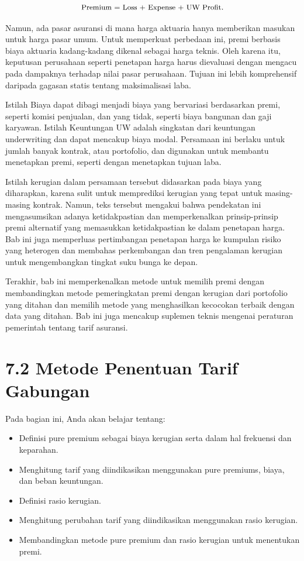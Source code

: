 \documentclass[
]{book}
\providecommand{\tightlist}{%
  \setlength{\itemsep}{0pt}\setlength{\parskip}{0pt}}
\begin{document}
\begin{equation}
\small{
\text{Premium = Loss + Expense + UW Profit} .
}
\end{equation}

Namun, ada pasar asuransi di mana harga aktuaria hanya memberikan masukan untuk harga pasar umum. Untuk memperkuat perbedaan ini, premi berbasis biaya aktuaria kadang-kadang dikenal sebagai harga teknis. Oleh karena itu, keputusan perusahaan seperti penetapan harga harus dievaluasi dengan mengacu pada dampaknya terhadap nilai pasar perusahaan. Tujuan ini lebih komprehensif daripada gagasan statis tentang maksimalisasi laba.

Istilah Biaya dapat dibagi menjadi biaya yang bervariasi berdasarkan premi, seperti komisi penjualan, dan yang tidak, seperti biaya bangunan dan gaji karyawan. Istilah Keuntungan UW adalah singkatan dari keuntungan underwriting dan dapat mencakup biaya modal. Persamaan ini berlaku untuk jumlah banyak kontrak, atau portofolio, dan digunakan untuk membantu menetapkan premi, seperti dengan menetapkan tujuan laba.

Istilah kerugian dalam persamaan tersebut didasarkan pada biaya yang diharapkan, karena sulit untuk memprediksi kerugian yang tepat untuk masing-masing kontrak. Namun, teks tersebut mengakui bahwa pendekatan ini mengasumsikan adanya ketidakpastian dan memperkenalkan prinsip-prinsip premi alternatif yang memasukkan ketidakpastian ke dalam penetapan harga. Bab ini juga memperluas pertimbangan penetapan harga ke kumpulan risiko yang heterogen dan membahas perkembangan dan tren pengalaman kerugian untuk mengembangkan tingkat suku bunga ke depan.

Terakhir, bab ini memperkenalkan metode untuk memilih premi dengan membandingkan metode pemeringkatan premi dengan kerugian dari portofolio yang ditahan dan memilih metode yang menghasilkan kecocokan terbaik dengan data yang ditahan. Bab ini juga mencakup suplemen teknis mengenai peraturan pemerintah tentang tarif asuransi.

\hypertarget{metode-penentuan-tarif-gabungan}{%
\chapter{7.2 Metode Penentuan Tarif Gabungan}\label{metode-penentuan-tarif-gabungan}}

Pada bagian ini, Anda akan belajar tentang:

\begin{itemize}
\tightlist
\item
  Definisi pure premium sebagai biaya kerugian serta dalam hal frekuensi dan keparahan.
\item
  Menghitung tarif yang diindikasikan menggunakan pure premiums, biaya, dan beban keuntungan.
\item
  Definisi rasio kerugian.
\item
  Menghitung perubahan tarif yang diindikasikan menggunakan rasio kerugian.
\item
  Membandingkan metode pure premium dan rasio kerugian untuk menentukan premi.
\end{itemize}
\end{document}
